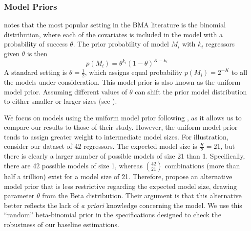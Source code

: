 \begin{refsection}
\subsubsection{Model Priors}
\textcite{MoralBenito2012} notes that the most popular setting in the \ac{BMA} literature is the binomial distribution, where each of the covariates is included in the model with a probability of success $\theta$. The prior probability of model $M_{i}$ with $k_{i}$ regressors given $\theta$ is then
\begin{equation}
	p(M_{i})=\theta^{k_{i}}(1-\theta)^{K-k_{i}}
\end{equation}
A standard setting is $\theta=\frac{1}{2}$, which assigns equal probability $p(M_{i}) = 2^{-K}$ to all the models under consideration. This model prior is also known as the uniform model prior. Assuming different values of $\theta$ can shift the prior model distribution to either smaller or larger sizes (see \textcite{Zeugner2011}).

We focus on models using the uniform model prior following \textcite{Fernandezetal2001}, as it allows us to compare our results to those of their study. However, the uniform model prior tends to assign greater weight to intermediate model sizes. For illustration, consider our dataset of 42 regressors. The expected model size is $\frac{K}{2} = 21$, but there is clearly a larger number of possible models of size 21 than 1. Specifically, there are 42 possible models of size 1, whereas ${42\choose 21}$ combinations (more than half a trillion) exist for a model size of 21. Therefore, \textcite{LeySteel2009} propose an alternative model prior that is less restrictive regarding the expected model size, drawing parameter $\theta$ from the Beta distribution. Their argument is that this alternative better reflects the lack of \textit{a priori} knowledge concerning the model. We use this ``random'' beta-binomial prior in the specifications designed to check the robustness of our baseline estimations.


\end{refsection}
